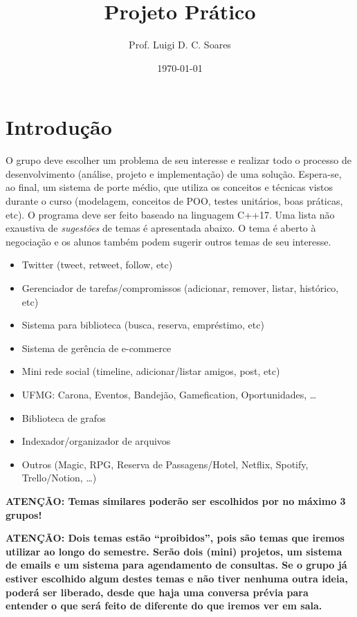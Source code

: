 \documentclass[11pt]{article}
\author{Prof. Luigi D. C. Soares}
\date{\today}
\title{Projeto Prático}
\begin{document}
\begin{center}
    \Large\bfseries\thetitle{}
\end{center}

\section{Introdução}
\label{sec:org0cb1c6c}

O grupo deve escolher um problema de seu interesse e realizar todo o
processo de desenvolvimento (análise, projeto e implementação) de uma
solução. Espera-se, ao final, um sistema de porte médio, que utiliza
os conceitos e técnicas vistos durante o curso (modelagem, conceitos
de POO, testes unitários, boas práticas, etc). O programa deve ser
feito baseado na linguagem C++17. Uma lista não exaustiva de \emph{sugestões}
de temas é apresentada abaixo. O tema é aberto à negociação e os
alunos também podem sugerir outros temas de seu interesse.

\begin{itemize}
\item Twitter (tweet, retweet, follow, etc)
\item Gerenciador de tarefas/compromissos (adicionar, remover, listar, histórico, etc)
\item Sistema para biblioteca (busca, reserva, empréstimo, etc)
\item Sistema de gerência de e-commerce
\item Mini rede social (timeline, adicionar/listar amigos, post, etc)
\item UFMG: Carona, Eventos, Bandejão, Gamefication, Oportunidades, \ldots{}
\item Biblioteca de grafos
\item Indexador/organizador de arquivos
\item Outros (Magic, RPG, Reserva de Passagens/Hotel, Netflix, Spotify, Trello/Notion, \ldots{})
\end{itemize}

\textbf{ATENÇÃO: Temas similares poderão ser escolhidos por no máximo 3 grupos!}

\textbf{ATENÇÃO: Dois temas estão ``proibidos'', pois são temas que iremos}
\textbf{utilizar ao longo do semestre. Serão dois (mini) projetos, um sistema}
\textbf{de emails e um sistema para agendamento de consultas. Se o grupo já}
\textbf{estiver escolhido algum destes temas e não tiver nenhuma outra ideia,}
\textbf{poderá ser liberado, desde que haja uma conversa prévia para entender}
\textbf{o que será feito de diferente do que iremos ver em sala.}
\end{document}

